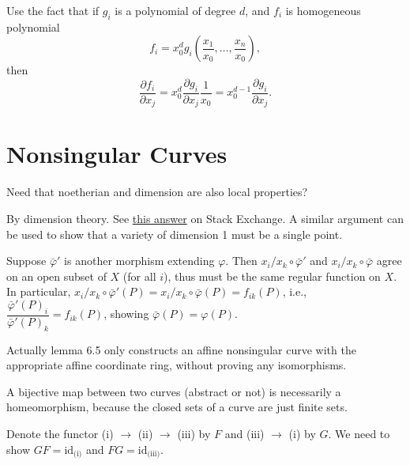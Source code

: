 \documentclass{note}
\newcommand{\id}{\mathrm{id}}
\begin{document}
\setcounter{exercise}{7}
\Ex
Use the fact that if $g_i$ is a polynomial of degree $d$, and $f_i$ is
homogeneous polynomial
\begin{equation*}
  f_i = x_0^d g_i\left(\frac{x_1}{x_0}, \dots, \frac{x_n}{x_0}\right),
\end{equation*}
then
\begin{equation*}
  \frac{\partial f_i}{\partial x_j}
  = x_0^d\frac{\partial g_i}{\partial x_j}\frac{1}{x_0}
  = x_0^{d-1}\frac{\partial g_i}{\partial x_j}.
\end{equation*}

\section{Nonsingular Curves}
 Need that noetherian and dimension are also local
properties?

By dimension theory. See
\href{https://math.stackexchange.com/questions/140592/closed-proper-subvarieties-of-curves-are-finite-sets-of-points}
{this answer} on Stack Exchange. A similar argument can be used to show that a
variety of dimension 1 must be a single point.

Suppose $\bar\varphi'$ is another morphism extending $\varphi$. Then
$x_i/x_k\circ\bar\varphi'$ and $x_i/x_k\circ\bar\varphi$ agree on an open
subset of $X$ (for all $i$), thus must be the same regular function on $X$. In
particular, $x_i/x_k\circ\bar\varphi'(P) = x_i/x_k\circ\bar\varphi(P) =
  f_{ik}(P)$, i.e., $\dfrac{\bar\varphi'(P)_i}{\bar\varphi'(P)_k} = f_{ik}(P)$,
showing $\bar\varphi(P) = \varphi(P)$.

 Actually lemma 6.5 only constructs an affine nonsingular curve
with the appropriate affine coordinate ring, without proving any isomorphisms.

A bijective map between two curves (abstract or not) is necessarily a
homeomorphism, because the closed sets of a curve are just finite sets.

Denote the functor (i) $\to$ (ii) $\to$ (iii) by $F$ and (iii) $\to$ (i) by
$G$. We need to show $GF=\id_{\text{(i)}}$ and $FG=\id_{\text{(iii)}}$.
\end{document}
